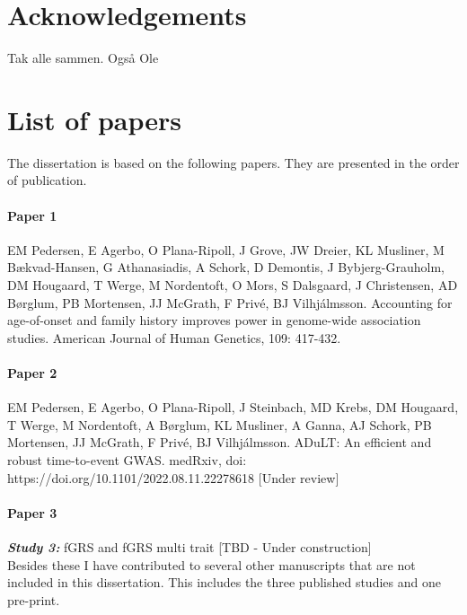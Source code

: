 \documentclass[a4paper, twoside]{report}
\begin{document}
\chapter*{Acknowledgements}
Tak alle sammen.
Også Ole

\chapter*{List of papers}
 
The dissertation is based on the following papers. They are presented in the order of publication.
\subsubsection{Paper 1}
EM Pedersen, E Agerbo, O Plana-Ripoll, J Grove, JW Dreier, KL Musliner, M Bækvad-Hansen, G Athanasiadis, A Schork, D Demontis, J Bybjerg-Grauholm, DM Hougaard, T Werge, M Nordentoft, O Mors, S Dalsgaard, J Christensen,  AD Børglum, PB Mortensen, JJ McGrath, F Privé, BJ Vilhjálmsson. Accounting for age-of-onset and family history improves power in genome-wide association studies. American Journal of Human Genetics, 109: 417-432.

\subsubsection{Paper 2}
EM Pedersen, E Agerbo, O Plana-Ripoll, J Steinbach, MD Krebs, DM Hougaard, T Werge, M Nordentoft, A Børglum,  KL Musliner, A Ganna, AJ Schork, PB Mortensen,  JJ McGrath,  F Privé, BJ Vilhjálmsson. ADuLT: An efficient and robust time-to-event GWAS. medRxiv, doi: https://doi.org/10.1101/2022.08.11.22278618 [Under review]

\subsubsection{Paper 3}
\textbf{\textit{Study 3:}} fGRS and fGRS multi trait [TBD - Under construction]
\mbox{}
\\

Besides these I have contributed to several other manuscripts that are not included in this dissertation. This includes the three published studies and one pre-print.
\end{document}
